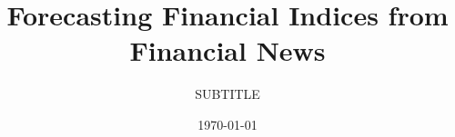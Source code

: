 \documentclass[nofilelist]{cslthse-msc}
\title{Forecasting Financial Indices from Financial News}
\subtitle{SUBTITLE}\marginpar{Have a subtitle or remove it}
\date{\today}
\begin{document}
\renewcommand{\bibname}{References}

\makefrontmatter






{} %

\begin{appendices}




\printfilelist

\checkoddpage
\ifoddpage
\else
   \newpage
   \thispagestyle{empty}
   \mbox{ }
\fi
%
\end{appendices}
\end{document}
